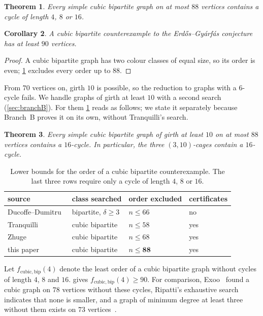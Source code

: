 \documentclass[11pt]{amsart}
\newtheorem{theorem}{Theorem}[section]
\newtheorem{corollary}[theorem]{Corollary}
\theoremstyle{definition}
\theoremstyle{remark}
\newcommand{\fcb}{f_{\mathrm{cubic,bip}}}
\begin{document}
\begin{theorem}\label{thm:main}
Every simple cubic bipartite graph on at most $88$ vertices contains a cycle of
length $4$, $8$ or $16$.
\end{theorem}

\begin{corollary}\label{cor:90}
A cubic bipartite counterexample to the Erdős–Gyárfás conjecture has at least
$90$ vertices.
\end{corollary}

\begin{proof}
A cubic bipartite graph has two colour classes of equal size, so its order is
even; \cref{thm:main} excludes every order up to $88$.
\end{proof}

From $70$ vertices on, girth $10$ is possible, so the reduction to graphs with
a $6$-cycle fails. We handle graphs of girth at least $10$ with a second search
(\cref{sec:branchB}). For them \cref{thm:main} reads as follows; we state it
separately because Branch~B proves it on its own, without Tranquilli's search.

\begin{theorem}\label{thm:girth10}
Every simple cubic bipartite graph of girth at least $10$ on at most $88$
vertices contains a $16$-cycle. In particular, the three $(3,10)$-cages contain
a $16$-cycle.
\end{theorem}

\begin{table}[ht]
\centering
\caption{Lower bounds for the order of a cubic bipartite counterexample. The
last three rows require only a cycle of length $4$, $8$ or $16$.}
\label{tab:history}
\begin{tabular}{@{}llll@{}}
\toprule
source & class searched & order excluded & certificates\\
\midrule
Ducoffe--Dumitru~\cite{DucoffeDumitru2026} & bipartite, $\delta\ge 3$ & $n\le 66$ & no\\
Tranquilli~\cite{Tranquilli2026} & cubic bipartite & $n\le 58$ & yes\\
Zhuge~\cite{Zhuge2026} & cubic bipartite & $n\le 68$ & yes\\
this paper & cubic bipartite & $n\le \mathbf{88}$ & yes\\
\bottomrule
\end{tabular}
\end{table}

Let $\fcb(4)$ denote the least order of a cubic bipartite graph without cycles
of length $4$, $8$ and $16$.  gives $\fcb(4)\ge 90$. For
comparison, Exoo~\cite{Exoo2014} found a cubic graph on $78$ vertices without
these cycles, Ripatti's exhaustive search~\cite{Ripatti2017} indicates that
none is smaller, and a graph of minimum degree at least three
without them exists on $73$ vertices~\cite{Marszalek2026}.
\end{document}
